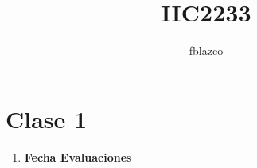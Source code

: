 \documentclass{article}
\author{fblazco}
\title{IIC2233}
\begin{document}
	\maketitle
    \section{Clase 1}
    \begin{enumerate}
        \item \textbf{Fecha Evaluaciones}
    \end{enumerate}    
          
        
\end{document}
